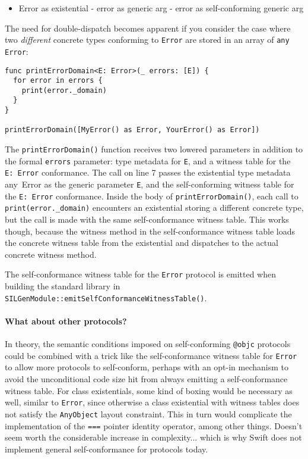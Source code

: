 \documentclass[a4paper,headsepline,bibliography=totoc,toc=flat,fleqn,twoside=semi]{scrbook}
\theoremstyle{definition}
\theoremstyle{definition}
\theoremstyle{definition}
\begin{document}
\begin{itemize}
\item Error as existential - error as generic arg - error as self-conforming generic arg
\end{itemize}

The need for double-dispatch becomes apparent if you consider the case where two \emph{different} concrete types conforming to \texttt{Error} are stored in an array of \texttt{any Error}:
\begin{Verbatim}
func printErrorDomain<E: Error>(_ errors: [E]) {
  for error in errors {
    print(error._domain)
  }
}

printErrorDomain([MyError() as Error, YourError() as Error])
\end{Verbatim}
The \texttt{printErrorDomain()} function receives two lowered parameters in addition to the formal \texttt{errors} parameter: type metadata for \texttt{E}, and a witness table for the \texttt{E:~Error} conformance. The call on line 7 passes the existential type metadata {any~Error} as the generic parameter \texttt{E}, and the self-conforming witness table for the \texttt{E:~Error} conformance. Inside the body of \texttt{printErrorDomain()}, each call to \texttt{print(error.\_domain)} encounters an existential storing a different concrete type, but the call is made with the same self-conformance witness table. This works though, because the witness method in the self-conformance witness table loads the concrete witness table from the existential and dispatches to the actual concrete witness method.

The self-conformance witness table for the \texttt{Error} protocol is emitted when building the standard library in \texttt{SILGenModule::emitSelfConformanceWitnessTable()}.

\paragraph{What about other protocols?} In theory, the semantic conditions imposed on self-conforming \texttt{@objc} protocols could be combined with a trick like the self-conformance witness table for \texttt{Error} to allow more protocols to self-conform, perhaps with an opt-in mechanism to avoid the unconditional code size hit from always emitting a self-conformance witness table. For class existentials, some kind of boxing would be necessary as well, similar to \texttt{Error}, since otherwise a class existential with witness tables does not satisfy the \texttt{AnyObject} layout constraint. This in turn would complicate the implementation of the \texttt{===} pointer identity operator, among other things. Doesn't seem worth the considerable increase in complexity... which is why Swift does not implement general self-conformance for protocols today.
\end{document}

